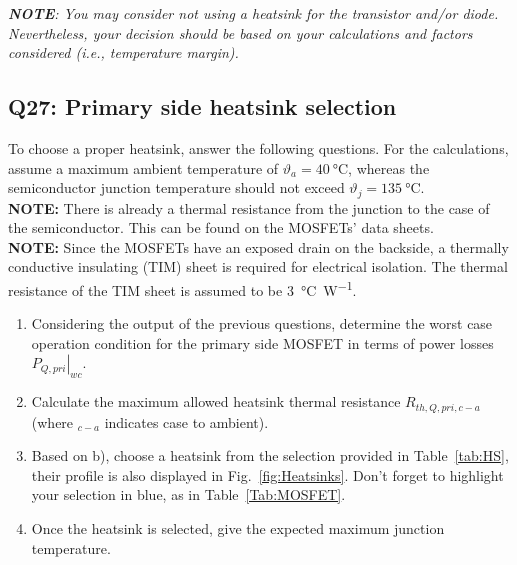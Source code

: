 \documentclass{PELsmallreport}
\begin{document}
\hfill{}

\newpage
\textit{\textbf{NOTE}: You may consider not using a heatsink for the transistor and/or diode. Nevertheless, your decision should be based on your calculations and factors considered (i.e., temperature margin).}

\subsection{Q27: Primary side heatsink selection} 
To choose a proper heatsink, answer the following questions. For the calculations, assume a maximum ambient temperature of $\vartheta_a=\SI{40}{\degreeCelsius}$, whereas the semiconductor junction temperature should not exceed $\vartheta_j=\SI{135}{\degreeCelsius}$. \\

\textbf{NOTE:} There is already a thermal resistance from the junction to the case of the semiconductor. This can be found on the MOSFETs' data sheets.\\
\textbf{NOTE:} Since the MOSFETs have an exposed drain on the backside, a thermally conductive insulating (TIM) sheet is required for electrical isolation. The thermal resistance of the TIM sheet is assumed to be \SI{3}{\degreeCelsius\per\watt}.\\

\vspace{0.4em}
\begin{enumerate}[label=\alph*)]
	\item Considering the output of the previous questions, determine the worst case operation condition for the primary side MOSFET in terms of power losses $\left.P_{Q,pri}\right|_{wc}$. 
	\item Calculate the maximum allowed heatsink thermal resistance $R_{th,Q,pri,c-a}$ (where $_{c-a}$ indicates case to ambient).
	\item Based on b), choose a heatsink from the selection provided in Table~\ref{tab:HS}, their profile is also displayed in Fig.~\ref{fig:Heatsinks}. Don't forget to highlight your selection in \colorbox{blue!20}{blue}, as in Table~\ref{Tab:MOSFET}.
	\item Once the heatsink is selected, give the expected maximum junction temperature.
\end{enumerate}

\vspace{0.4em}
\end{document}
